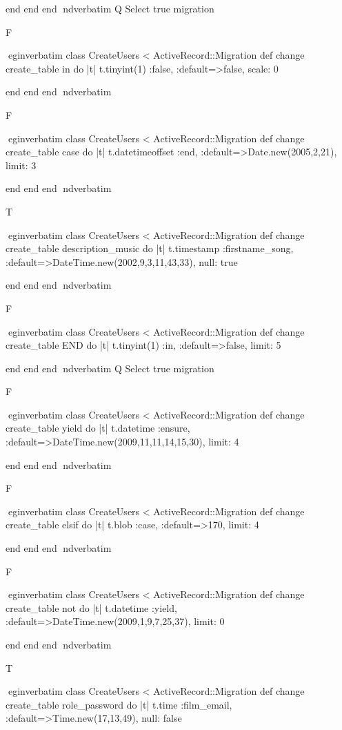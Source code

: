     end 
  end 
end
nd{verbatim}
Q
 Select true migration

F

egin{verbatim}
 class CreateUsers < ActiveRecord::Migration 
  def change 
    create_table in do |t| 
      t.tinyint(1) :false, :default=>false, scale: 0
    
    end 
  end 
end
nd{verbatim}

F

egin{verbatim}
 class CreateUsers < ActiveRecord::Migration 
  def change 
    create_table case do |t| 
      t.datetimeoffset :end, :default=>Date.new(2005,2,21), limit: 3
    
    end 
  end 
end
nd{verbatim}

T

egin{verbatim}
 class CreateUsers < ActiveRecord::Migration 
  def change 
    create_table description_music do |t| 
      t.timestamp :firstname_song, :default=>DateTime.new(2002,9,3,11,43,33), null: true
    
    end 
  end 
end
nd{verbatim}

F

egin{verbatim}
 class CreateUsers < ActiveRecord::Migration 
  def change 
    create_table END do |t| 
      t.tinyint(1) :in, :default=>false, limit: 5
    
    end 
  end 
end
nd{verbatim}
Q
 Select true migration

F

egin{verbatim}
 class CreateUsers < ActiveRecord::Migration 
  def change 
    create_table yield do |t| 
      t.datetime :ensure, :default=>DateTime.new(2009,11,11,14,15,30), limit: 4
    
    end 
  end 
end
nd{verbatim}

F

egin{verbatim}
 class CreateUsers < ActiveRecord::Migration 
  def change 
    create_table elsif do |t| 
      t.blob :case, :default=>170, limit: 4
    
    end 
  end 
end
nd{verbatim}

F

egin{verbatim}
 class CreateUsers < ActiveRecord::Migration 
  def change 
    create_table not do |t| 
      t.datetime :yield, :default=>DateTime.new(2009,1,9,7,25,37), limit: 0
    
    end 
  end 
end
nd{verbatim}

T

egin{verbatim}
 class CreateUsers < ActiveRecord::Migration 
  def change 
    create_table role_password do |t| 
      t.time :film_email, :default=>Time.new(17,13,49), null: false
    
